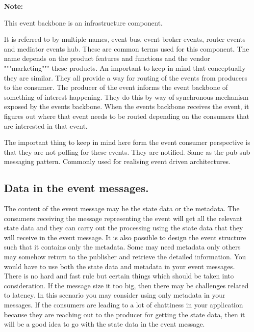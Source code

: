 \documentclass[a4paper, 11pt]{book}
\newenvironment{note}{
    \begin{siderule}
        \textbf{Note: }
        }{
    \end{siderule}
}
\begin{document}
    \begin{note}
        This event backbone is an infrastructure component.
    \end{note}

    It is referred to by multiple names, event bus, event broker events, router events and mediator events hub.
    These are common terms used for this component.
    The name depends on the product features and functions and the vendor """marketing""" these products.
    An important to keep in mind that conceptually they are similar.
    They all provide a way for routing of the events from producers to the consumer.
    The producer of the event informs the event backbone of something of interest happening.
    They do this by way of synchronous mechanism exposed by the events backbone.
    When the events backbone receives the event, it figures out where that event needs to be routed depending on the consumers that are interested in that event.

    The important thing to keep in mind here form the event consumer perspective is that they are not polling for these events.
    They are notified.
    Same as the pub sub messaging pattern.
    Commonly used for realising event driven architectures.

    \subsection{Data in the event messages.}
    The content of the event message may be the state data or the metadata.
    The consumers receiving the message representing the event will get all the relevant state data and they can carry out the processing using the state data that they will receive in the event message.
    It is also possible to design the event structure such that it contains only the metadata.
    Some may need metadata only others may somehow return to the publisher and retrieve the detailed information.
    You would have to use both the state data and metadata in your event messages.
    There is no hard and fast rule but certain things which should be taken into consideration.
    If the message size it too big, then there may be challenges related to latency.
    In this scenario you may consider using only metadata in your messages.
    If the consumers are leading to a lot of chattiness in your application because they are reaching out to the producer for getting the state data, then it will be a good idea to go with the state data in the event message.
\end{document}
